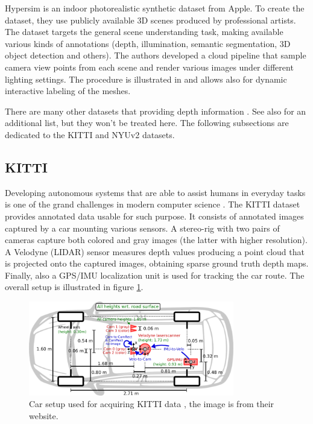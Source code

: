 Hypersim \cite{Hypersim} is an indoor photorealistic synthetic dataset from Apple.
To create the dataset, they use publicly available 3D scenes produced by professional artists.
The dataset targets the general scene understanding task, making available various kinds of annotations (depth, illumination, semantic segmentation, 3D object detection and others).
The authors developed a cloud pipeline that sample camera view points from each scene and render various images under different lighting settings.
The procedure is illustrated in \cite{Hypersim} and allows also for dynamic interactive labeling of the meshes.

There are many other datasets that providing depth information \cite{Cityscapes, saxena5, ETH, DIODE, SYNTHIA, DispNet}.
See also \cite{MiDas} for an additional list, but they won't be treated here.
The following subsections are dedicated to the KITTI and NYUv2 datasets.

\subsection{KITTI}
Developing autonomous systems that are able to assist humans in everyday tasks is one of the grand challenges in modern computer science \cite{KITTI}.
The KITTI dataset \cite{KITTI} provides annotated data usable for such purpose.
It consists of annotated images captured by a car mounting various sensors.
A stereo-rig with two pairs of cameras capture both colored and gray images (the latter with higher resolution).
A Velodyne (LIDAR) sensor measures depth values producing a point cloud that is projected onto the captured images, obtaining sparse ground truth depth maps.
Finally, also a GPS/IMU localization unit is used for tracking the car route.
The overall setup is illustrated in figure \ref{fig:kitti_car}.

\begin{figure}
	\centering
    \includegraphics[width=0.8\textwidth]{figs/kitti_car}
    \caption{
        Car setup used for acquiring KITTI data \cite{KITTI}, the image is from their website.
        \label{fig:kitti_car}
    }
\end{figure}


